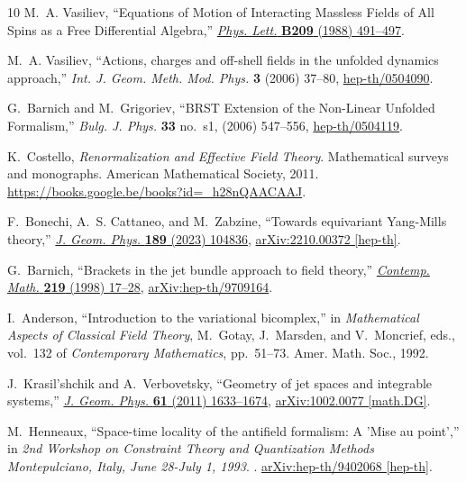 \documentclass[a4paper,12pt]{article}
\numberwithin{equation}{section} %
\begin{document}
\begin{thebibliography}{10}
M.~A. Vasiliev, ``{Equations of Motion of Interacting Massless Fields of All Spins as a Free Differential Algebra},''
\href{http://dx.doi.org/10.1016/0370-2693(88)91179-3}{{\em Phys. Lett.} {\bfseries B209} (1988) 491--497}.

M.~A. Vasiliev, ``{A}ctions, charges and off-shell fields in the unfolded dynamics approach,'' {\em Int. J. Geom. Meth. Mod. Phys.} {\bfseries 3} (2006) 37--80,
\href{http://arxiv.org/abs/hep-th/0504090}{{\ttfamily hep-th/0504090}}.

G.~Barnich and M.~Grigoriev, ``{BRST Extension of the Non-Linear Unfolded Formalism},'' {\em Bulg. J. Phys.} {\bfseries 33} no.~s1, (2006) 547--556, \href{http://arxiv.org/abs/hep-th/0504119}{{\ttfamily hep-th/0504119}}.

K.~Costello, {\em Renormalization and Effective Field Theory}.
\newblock Mathematical surveys and monographs. American Mathematical Society, 2011.
\newblock \url{https://books.google.be/books?id=_h28nQAACAAJ}.

F.~Bonechi, A.~S. Cattaneo, and M.~Zabzine, ``{Towards equivariant Yang-Mills theory},'' \href{http://dx.doi.org/10.1016/j.geomphys.2023.104836}{{\em J. Geom. Phys.} {\bfseries 189} (2023) 104836}, \href{http://arxiv.org/abs/2210.00372}{{\ttfamily arXiv:2210.00372 [hep-th]}}.

G.~Barnich, ``{Brackets in the jet bundle approach to field theory},'' \href{http://dx.doi.org/10.1090/conm/219/03064}{{\em Contemp. Math.} {\bfseries 219} (1998) 17--28}, \href{http://arxiv.org/abs/hep-th/9709164}{{\ttfamily arXiv:hep-th/9709164}}.

I.~Anderson, ``{I}ntroduction to the variational bicomplex,'' in {\em Mathematical Aspects of Classical Field Theory}, M.~Gotay, J.~Marsden, and V.~Moncrief, eds., vol.~132 of {\em Contemporary Mathematics}, pp.~51--73.
\newblock Amer. Math. Soc., 1992.

J.~Krasil'shchik and A.~Verbovetsky, ``{G}eometry of jet spaces and integrable systems,'' \href{http://dx.doi.org/10.1016/j.geomphys.2010.10.012}{{\em J. Geom. Phys.} {\bfseries 61} (2011) 1633--1674},
\href{http://arxiv.org/abs/1002.0077}{{\ttfamily arXiv:1002.0077 [math.DG]}}.

M.~Henneaux, ``{Space-time locality of the antifield formalism: A 'Mise au point'},'' in {\em {2nd Workshop on Constraint Theory and Quantization Methods Montepulciano, Italy, June 28-July 1, 1993}}.
.
\newblock
\href{http://arxiv.org/abs/hep-th/9402068}{{\ttfamily arXiv:hep-th/9402068 [hep-th]}}.
\newblock


\end{thebibliography}
\end{document}
